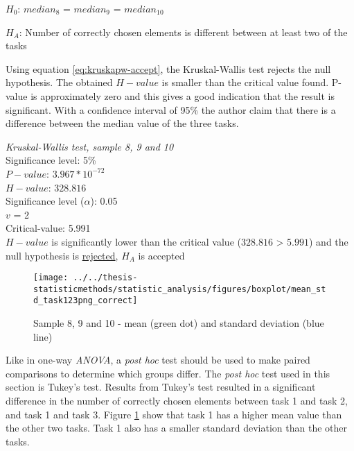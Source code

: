 \centerline{$H_{0}$: $median_8$ = $median_9$ = $median_10$}
\centerline{$H_{A}$: Number of correctly chosen elements is different between at least two of the tasks}

Using equation \ref{eq:kruskapw-accept}, the Kruskal-Wallis test rejects the null hypothesis. The obtained $H-value$ is smaller than the critical value found. P-value is approximately zero and this gives a good indication that the result is significant. With a confidence interval of 95\% the author claim that there is a difference between the median value of the three tasks. \\[0.2cm]

 \begin{center}
	\begin{tcolorbox}[width=0.8\textwidth]
		\centering
		\textit{Kruskal-Wallis test, sample 8, 9 and 10}\\
		Significance level: 5\%  \\[0.5cm]
		
		$P-value$: $3.967* 10^{-72}$ \\
		$H-value$: $328.816$ \\
		Significance level ($\alpha$): 0.05 \\
		$v$ = 2\\ %
		Critical-value:  5.991\\[0.2cm] %
		
		$H-value$ is significantly lower than the critical value ($328.816$ > $5.991$) and the null hypothesis is \underline{rejected}, $H_A$ is accepted\\[0.5cm]
	\end{tcolorbox} 
\end{center}

\begin{figure}[h!]
	\centering
	\texttt{[image: ../../thesis-statisticmethods/statistic\_analysis/figures/boxplot/mean\_std\_task123png\_correct]}
	\caption{Sample 8, 9 and 10 - mean (green dot) and standard deviation (blue line)}
	\label{fig:meanstdtask123pngcorrect}
\end{figure}

Like in one-way \textit{ANOVA}, a \textit{post hoc} test should be used to make paired comparisons to determine which groups differ. The \textit{post hoc} test used in this section is Tukey's test. Results from Tukey's test resulted in a significant difference in the number of correctly chosen elements between task 1 and task 2, and task 1 and task 3. Figure \ref{fig:meanstdtask123pngcorrect} show that task 1 has a higher mean value than the other two tasks. Task 1 also has a smaller standard deviation than the other tasks. \\[0.2cm]

